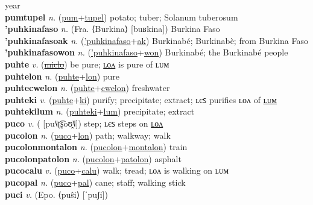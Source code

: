 year \label{pumkwelwel} \\
\textbf{pumtupel} \textit{n.} (\hyperref[pum]{pum}+\hyperref[tupel]{tupel})
potato; tuber; Solanum tuberosum \label{pumtupel} \\
\textbf{'puhkinafaso} \textit{n.} (Fra. ⟨Burkina⟩ [buʁkina])
Burkina Faso \label{'puhkinafaso} \\
\textbf{'puhkinafasoak} \textit{n.} (\hyperref['puhkinafaso]{'puhkinafaso}+\hyperref[ak]{ak})
Burkinabé; Burkinabè; from Burkina Faso \label{'puhkinafasoak} \\
\textbf{'puhkinafasowon} \textit{n.} (\hyperref['puhkinafaso]{'puhkinafaso}+\hyperref[won]{won})
Burkinabé; the Burkinabé people \label{'puhkinafasowon} \\
\textbf{puhte} \textit{v.} (\hyperref[miclo]{\sout{miclo}})
be pure; \hyperref[puhtelon]{ʟᴏᴧ} is pure of ʟᴜᴍ \label{puhte} \\
\textbf{puhtelon} \textit{n.} (\hyperref[puhte]{puhte}+\hyperref[lon]{lon})
pure \label{puhtelon} \\
\textbf{puhtecwelon} \textit{n.} (\hyperref[puhte]{puhte}+\hyperref[cwelon]{cwelon})
freshwater \label{puhtecwelon} \\
\textbf{puhteki} \textit{v.} (\hyperref[puhte]{puhte}+\hyperref[ki]{ki})
purify; precipitate; extract; ʟєꜱ purifies ʟᴏᴧ of \hyperref[puhtekilum]{ʟᴜᴍ} \label{puhteki} \\
\textbf{puhtekilum} \textit{n.} (\hyperref[puhteki]{puhteki}+\hyperref[lum]{lum})
precipitate; extract \label{puhtekilum} \\
\textbf{puco} \textit{v.} ( [pu˥˩ʈ͡ʂoʊ̯˥˩])
step; ʟєꜱ steps on \hyperref[pucolon]{ʟᴏᴧ} \label{puco} \\
\textbf{pucolon} \textit{n.} (\hyperref[puco]{puco}+\hyperref[lon]{lon})
path; walkway; walk \label{pucolon} \\
\textbf{pucolonmontalon} \textit{n.} (\hyperref[pucolon]{pucolon}+\hyperref[montalon]{montalon})
train \label{pucolonmontalon} \\
\textbf{pucolonpatolon} \textit{n.} (\hyperref[pucolon]{pucolon}+\hyperref[patolon]{patolon})
asphalt \label{pucolonpatolon} \\
\textbf{pucocalu} \textit{v.} (\hyperref[puco]{puco}+\hyperref[calu]{calu})
walk; tread; ʟᴏᴧ is walking on ʟᴜᴍ \label{pucocalu} \\
\textbf{pucopal} \textit{n.} (\hyperref[puco]{puco}+\hyperref[pal]{pal})
cane; staff; walking stick \label{pucopal} \\
\textbf{puci} \textit{v.} (Epo. ⟨puŝi⟩ [ˈpuʃi])

